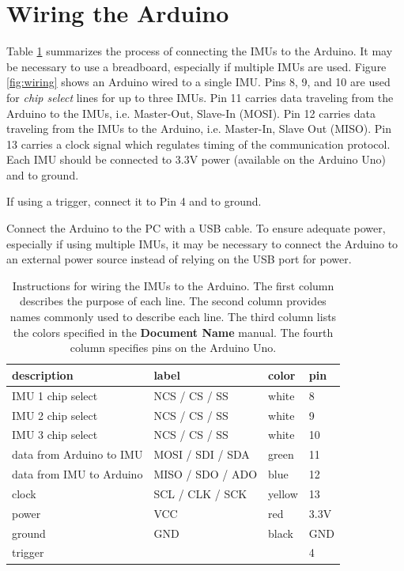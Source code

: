 \documentclass[11pt,letterpaper,article,oneside]{memoir}
\begin{document}
\section{Wiring the Arduino}
\label{sec:wiring}
Table \ref{tab:wiring} summarizes the process of connecting the IMUs to the
Arduino.  It may be necessary to use a breadboard, especially if multiple IMUs
are used.  Figure \ref{fig:wiring} shows an Arduino wired to a single IMU.  Pins
8, 9, and 10 are used for \emph{chip select} lines for up to three IMUs. Pin 11
carries data traveling from the Arduino to the IMUs, i.e. Master-Out, Slave-In
(MOSI).  Pin 12 carries data traveling from the IMUs to the Arduino, i.e.
Master-In, Slave Out (MISO). Pin 13 carries a clock signal which regulates
timing of the communication protocol.  Each IMU should be connected to 3.3V
power (available on the Arduino Uno) and to ground.

If using a trigger, connect it to Pin 4 and to ground.

Connect the Arduino to the PC with a USB cable.  To ensure adequate power,
especially if using multiple IMUs, it may be necessary to connect the Arduino to
an external power source instead of relying on the USB port for power.

\begin{table}
\centering
\begin{tabular}{@{}*4l@{}}
\toprule
description & label & color & pin \\
\midrule 
IMU 1 chip select & NCS / CS / SS & white & 8 \\
IMU 2 chip select & NCS / CS / SS & white & 9 \\
IMU 3 chip select & NCS / CS / SS & white & 10 \\
data from Arduino to IMU & MOSI / SDI / SDA & green & 11 \\
data from IMU to Arduino & MISO / SDO / ADO & blue & 12 \\
clock & SCL / CLK / SCK & yellow & 13 \\
power & VCC & red & 3.3V \\
ground & GND & black & GND \\
trigger &  &  & 4 \\
\bottomrule
\end{tabular}

\caption{Instructions for wiring the IMUs to the Arduino. The first column
describes the purpose of each line. The second column provides names commonly
used to describe each line. The third column lists the colors specified in the
\textbf{Document Name} manual. The fourth column specifies pins on the Arduino
Uno.}

\label{tab:wiring}
\end{table}
\end{document}
